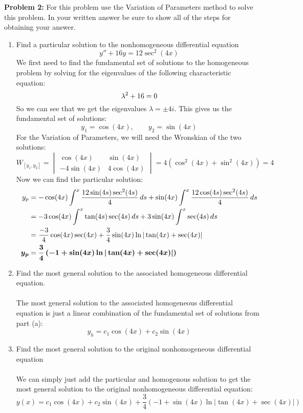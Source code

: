 \documentclass[12pt]{article}
\begin{document}
\newpage 

\noindent \textbf{Problem 2: }For this problem use the Variation of Parameters method to solve this problem. In your written answer be sure to show all of the steps for obtaining your answer.
\\ 
	\begin{enumerate}[label = (\alph*)]
		\item Find a particular solution to the nonhomogeneous differential equation 
			$$
			y'' + 16y = 12\sec^2(4x)
			$$
		We first need to find the fundamental set of solutions to the homogeneous problem by solving for the eigenvalues of the following characteristic equation:
			$$
			\lambda^2 + 16 = 0 \\
			$$
		So we can see that we get the eigenvalues $\lambda = \pm 4i$. This gives us the fundamental set of solutions:	
			$$
			y_1 = \cos(4x), \qquad y_2 = \sin(4x)
			$$
		For the Variation of Parameters, we will need the Wronskian of the two solutions:
			$$
			W_{[y_1,y_2]} = 
			\begin{vmatrix}
				\cos(4x) & \sin(4x) \\
				-4\sin(4x) & 4\cos(4x)
			\end{vmatrix}
			= 4(\cos^2(4x) + \sin^2(4x)) = 4
			$$
		Now we can find the particular solution:
			\begin{align*}
				y_p &= -\cos(4x) \int^{x} \frac{12\sin(4s)\sec^2(4s)}{4}\,ds + \sin(4x)\int^{x} \frac{12\cos(4s)\sec^2(4s)}{4}\,ds \\
				&= -3\cos(4x) \int^x \tan(4s)\sec(4s)\,ds + 3\sin(4x) \int^x \sec(4s)\,ds \\
				&= \frac{-3}{4}\cos(4x)\sec(4x) + \frac{3}{4}\sin(4x)\ln|\tan(4x) + \sec(4x) | \\
				\text{\boldmath $y_p $} &= \text{\boldmath$\frac{3}{4}\left( -1 + \sin(4x)\ln|\tan(4x) + \sec(4x) |\right)$}
			\end{align*}
		\item Find the most general solution to the associated homogeneous differential equation.
		\\ \\
		The most general solution to the associated homogeneous differential equation is just a linear combination of the fundamental set of solutions from part (a):
			\boldmath
			$$
			y_h = c_1\cos(4x) + c_2\sin(4x)
			$$
			\unboldmath
		\item Find the most general solution to the original nonhomogeneous differential equation
		\\ \\
		We can simply just add the particular and homogenous solution to get the most general solution to the original nonhomogeneous differential equation:
			\boldmath	
			$$
			y(x) = c_1\cos(4x) + c_2\sin(4x) + \frac{3}{4}\left( -1 + \sin(4x)\ln|\tan(4x) + \sec(4x) |\right)
			$$
			\unboldmath
	\end{enumerate}
\end{document}
